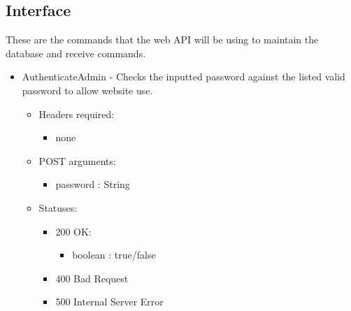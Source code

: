 \subsection{Interface}
    These are the commands that the web API will be using to maintain the database and receive commands.

    \begin{itemize}
        \item AuthenticateAdmin - Checks the inputted password against the listed valid password to allow website use.
        \begin{itemize}
        	\item Headers required:
        	\begin{itemize}
           		 \item none
       		 \end{itemize}
        	\item POST arguments:
        	\begin{itemize}
           		 \item password : String
      		 \end{itemize}
       		 \item Statuses:
        	\begin{itemize}
        		\item 200 OK:
           	 	\begin{itemize}
        			\item boolean : true/false
           		 \end{itemize}
        		\item 400 Bad Request
        		\item 500 Internal Server Error

        	\end{itemize}
	   \end{itemize}


	


\end{itemize}
